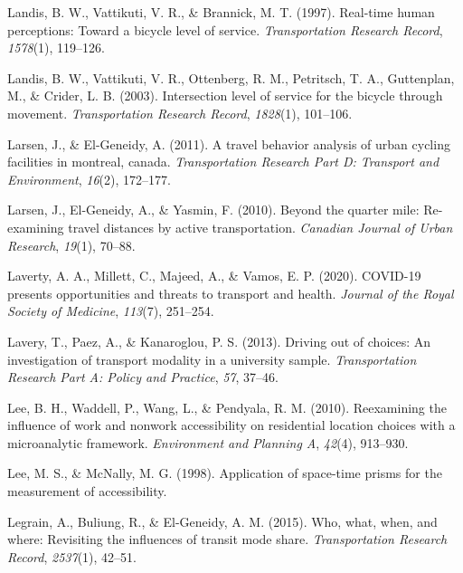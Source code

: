 \documentclass[
11pt, %
oneside, %
english, %
singlespacing, %
]{macthesis} %
\newlength{\cslhangindent}
\newenvironment{CSLReferences}[2] %
 {%
  \setlength{\parindent}{0pt}
  \ifodd #1 \everypar{\setlength{\hangindent}{\cslhangindent}}\ignorespaces\fi
  \ifnum #2 > 0
  \setlength{\parskip}{#2\baselineskip}
  \fi
 }%
 {}
\begin{document}
\begin{CSLReferences}{1}{0}
\leavevmode{}%
Landis, B. W., Vattikuti, V. R., \& Brannick, M. T. (1997). Real-time human perceptions: Toward a bicycle level of service. \emph{Transportation Research Record}, \emph{1578}(1), 119--126.

\leavevmode{}%
Landis, B. W., Vattikuti, V. R., Ottenberg, R. M., Petritsch, T. A., Guttenplan, M., \& Crider, L. B. (2003). Intersection level of service for the bicycle through movement. \emph{Transportation Research Record}, \emph{1828}(1), 101--106.

\leavevmode{}%
Larsen, J., \& El-Geneidy, A. (2011). A travel behavior analysis of urban cycling facilities in montreal, canada. \emph{Transportation Research Part D: Transport and Environment}, \emph{16}(2), 172--177.

\leavevmode{}%
Larsen, J., El-Geneidy, A., \& Yasmin, F. (2010). Beyond the quarter mile: Re-examining travel distances by active transportation. \emph{Canadian Journal of Urban Research}, \emph{19}(1), 70--88.

\leavevmode{}%
Laverty, A. A., Millett, C., Majeed, A., \& Vamos, E. P. (2020). COVID-19 presents opportunities and threats to transport and health. \emph{Journal of the Royal Society of Medicine}, \emph{113}(7), 251--254.

\leavevmode{}%
Lavery, T., Paez, A., \& Kanaroglou, P. S. (2013). Driving out of choices: An investigation of transport modality in a university sample. \emph{Transportation Research Part A: Policy and Practice}, \emph{57}, 37--46.

\leavevmode{}%
Lee, B. H., Waddell, P., Wang, L., \& Pendyala, R. M. (2010). Reexamining the influence of work and nonwork accessibility on residential location choices with a microanalytic framework. \emph{Environment and Planning A}, \emph{42}(4), 913--930.

\leavevmode{}%
Lee, M. S., \& McNally, M. G. (1998). Application of space-time prisms for the measurement of accessibility.

\leavevmode{}%
Legrain, A., Buliung, R., \& El-Geneidy, A. M. (2015). Who, what, when, and where: Revisiting the influences of transit mode share. \emph{Transportation Research Record}, \emph{2537}(1), 42--51.


\end{CSLReferences}
\end{document}
